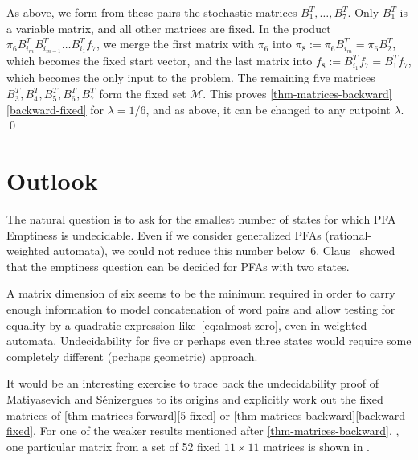 \documentclass[a4paper,cleveref, autoref, thm-restate]{lipics-v2021}
\newif\ifanonymous
\begin{document}

 As above, we form from these pairs the stochastic matrices
$B_1^T,\ldots,B_7^T$.
Only $B_1^T$ is a variable matrix, and all other matrices are fixed.
In the product
\begin{math}
 \pi_6B^T_{i_m}B_{i_{m-1}}^T \ldots B_{i_1}^Tf_7
\end{math},
we merge the first matrix with $\pi_6$ into
$\pi_8 := \pi_6B^T_{i_m} = \pi_6B^T_2$, which becomes the fixed start
vector,
and the last matrix %
into
$f_8 := B_{i_1}^Tf_7 = B_{1}^Tf_7$, which becomes the only input to the
problem.
The remaining five matrices
$B_3^T,B_4^T,B_5^T,B_6^T,B_7^T
$ form the fixed set $\mathcal{M}$.
This proves 
\autoref{thm-matrices-backward}\ref{backward-fixed}
for $\lambda=1/6$, and as above, it can be
changed to any cutpoint $\lambda$.
\qed


\section{Outlook}
\label{sec:outlook}
The natural question is to ask for the smallest number of states for which
PFA Emptiness is undecidable.
Even if we consider generalized PFAs (rational-weighted automata),
we could not reduce this number below~6.
Claus~\cite[Theorem 7 and Corollary, p.~155]{claus81} showed that
the emptiness question can be decided for
PFAs with two states.

A matrix dimension of six seems to be the minimum required in order to
carry enough information
to model concatenation of word
pairs and allow testing for equality by a quadratic expression like~\eqref{eq:almost-zero},
even in weighted
automata. Undecidability for five or perhaps even three states would
require some completely different (perhaps geometric) approach.


It would be an interesting exercise to trace back the
undecidability proof of
Matiyasevich and S{\'e}nizergues
\cite{matiyasevich2005decision}
to its origins
and explicitly work out the fixed matrices of
\autoref{thm-matrices-forward}\ref{5-fixed} or
\ref{thm-matrices-backward}\ref{backward-fixed}.
\ifanonymous
\else
For one of the weaker results mentioned after
\autoref{thm-matrices-backward},
\cite[Theorem~4b]{r-pfaeu-24},
one particular matrix from a set of 52 fixed $11\times 11$ matrices is
shown in 
\cite[Section~7.3]{r-pfaeu-24}. %
\end{document}
